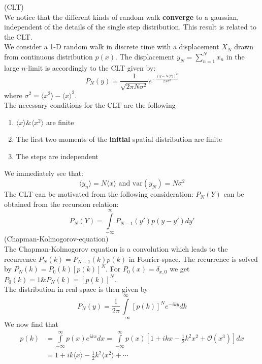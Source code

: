 \textbf{\underline{}} (CLT)\vspace{0.2cm}\\
We notice that the different kinds of random walk \textbf{converge} to a gaussian, independent of the details of the single step distribution. This result is related to the CLT.\\
We consider a 1-D random walk in discrete time with a displacement $X_N$ drawn from continuous distribution $p(x)$. The displacement $y_N=\sum\limits_{n=1}^Nx_n$ in the large $n$-limit is accordingly to the CLT given by:
\begin{equation*}
	P_N(y)=\frac{1}{\sqrt{2\pi N\sigma^2}}e^{-\frac{\left(y-N\langle x\rangle\right)^2}{2N\sigma^2}}
\end{equation*}
where $\sigma^2=\langle x^2\rangle - \langle x\rangle^2$.\\
The necessary conditions for the CLT are the following
\begin{enumerate}[label={$(\roman*)$}]
	\item $\langle x\rangle \&\langle x^2\rangle$ are finite
	\item The first two moments of the \textbf{initial} spatial distribution are finite
	\item The steps are independent
\end{enumerate}
We immediately see that:
\begin{equation*}
	\langle y_n\rangle =N\langle x\rangle \text{ and } \text{var}\left(y_N\right)=N\sigma^2
\end{equation*}
The CLT can be motivated from the following consideration: $P_N(Y)$ can be obtained from the recursion relation:
\begin{equation*}
	P_N(Y)=\int\limits_{-\infty}^\infty P_{N-1}(y')p(y-y')dy'
\end{equation*}
(Chapman-Kolmogorov-equation)\\
The Chapman-Kolmogorov equation is a convolution which leads to the recurrence $P_N(k)=P_{N-1}(k)p(k)$ in Fourier-space. The recurrence is solved by $P_N(k)=P_0(k)\left[p(k)\right]^N$. For $P_0(x)=\delta_{x,0}$ we get $P_0(k)=1 \& P_N(k)=\left[p(k)\right]^N$.\\
The distribution in real space is then given by
\begin{equation*}
	P_N(y)=\frac{1}{2\pi}\int\limits_{-\infty}^\infty\left[p(k)\right]^Ne^{-iky}dk
\end{equation*}
We now find that
\begin{align*}
	p(k)&=\int\limits_{-\infty}^\infty p(x)e^{ikx}dx=\int\limits_{-\infty}^\infty p(x)\left[1+ikx-\frac{1}{2}k^2x^2+\mathcal{O}(x^3)\right]dx\\
	&=1+ik\langle x\rangle -\frac{1}{2}k^2\langle x^2\rangle +\cdots
\end{align*}
